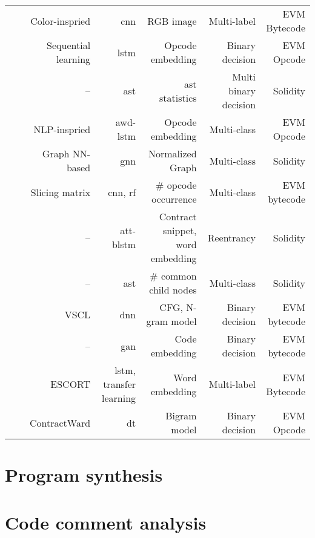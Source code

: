 \begin{ThreePartTable}
\begin{center}
\begin{tabularx}{1\textwidth}{clRRRRR}
            \cite{huang2018hunting} & \citeyear{huang2018hunting} & Color-inspried & \acrshort{cnn} & RGB image  & Multi-label & EVM Bytecode\\
            \cite{tann2019safer} & \citeyear{tann2019safer} & Sequential learning & \acrshort{lstm} & Opcode embedding & Binary decision & EVM Opcode\\
            \cite{momeni2019machine} & \citeyear{momeni2019machine} & -- & \acrshort{ast} & \acrshort{ast} statistics & Multi binary decision & Solidity \\
            \cite{gogineni2020multiclass} & \citeyear{gogineni2020multiclass} & NLP-inspried & \acrshort{awd-lstm} & Opcode embedding & Multi-class & EVM Opcode\\
            \cite{zhuang2020smart} & \citeyear{zhuang2020smart} & Graph NN-based & \acrshort{gnn} & Normalized Graph & Multi-class & Solidity\\
            \cite{xing2020anew} & \citeyear{xing2020anew} & Slicing matrix & \acrshort{cnn}, \acrshort{rf} & \# opcode occurrence & Multi-class & EVM bytecode\\
            \cite{qian2020towards} & \citeyear{qian2020towards} & -- &  \acrshort{att-blstm} & Contract snippet, word embedding & Reentrancy & Solidity \\
            \cite{xu2021security} & \citeyear{xu2021security} & -- & \acrshort{ast} & \# common child nodes & Multi-class & Solidity \\
            \cite{mi2021vscl} & \citeyear{mi2021vscl} & VSCL & \acrshort{dnn} & CFG, N-gram model & Binary decision & EVM bytecode\\
            \cite{zhao2021gan} & \citeyear{zhao2021gan} & -- & \acrshort{gan} & Code embedding & Binary decision & EVM bytecode\\
            \cite{lutz2021escort} & \citeyear{lutz2021escort} & ESCORT & \acrshort{lstm}, transfer learning & Word embedding & Multi-label & EVM Bytecode\\
            \cite{wang2021contractward} & \citeyear{wang2021contractward} & ContractWard & \acrshort{dt} & Bigram model & Binary decision & EVM Opcode\\
            
            \bottomrule
        \end{tabularx}
        \end{center}
    
    \end{ThreePartTable}


\section{Program synthesis}
\label{sec:program-synthesis}

\section{Code comment analysis}
\label{sec:code-comment-analysis}

